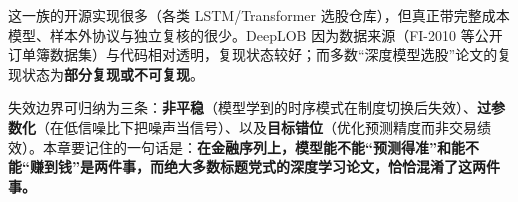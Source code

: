 这一族的开源实现很多（各类 LSTM/Transformer 选股仓库），但真正带完整成本模型、样本外协议与独立复核的很少。DeepLOB 因为数据来源（FI-2010\cite{ntakaris2018fi2010} 等公开订单簿数据集）与代码相对透明，复现状态较好；而多数“深度模型选股”论文的复现状态为\textbf{部分复现或不可复现}。

失效边界可归纳为三条：\textbf{非平稳}（模型学到的时序模式在制度切换后失效）、\textbf{过参数化}（在低信噪比下把噪声当信号）、以及\textbf{目标错位}（优化预测精度而非交易绩效）。本章要记住的一句话是：\textbf{在金融序列上，模型能不能“预测得准”和能不能“赚到钱”是两件事，而绝大多数标题党式的深度学习论文，恰恰混淆了这两件事。}
